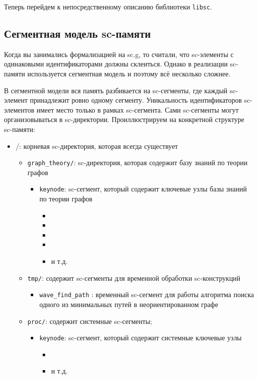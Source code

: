 Теперь перейдем к непосредственному описанию библиотеки
\texttt{libsc}.

\subsection{Сегментная модель sc-памяти}
\label{sec:libsc_segment_model}

Когда вы занимались формализацией на sc.g, то считали, что sc-элементы
с одинаковыми идентификаторами должны склеиться. Однако в реализации
sc-памяти используется сегментная модель и поэтому всё несколько
сложнее.

В сегментной модели вся память разбивается на sc-сегменты, где каждый
sc-элемент принадлежит ровно одному сегменту. Уникальность
идентификаторов sc-элементов имеет место только в рамках
sc-сегмента. Сами sc-сегменты могут организовываться в
sc-директории. Проиллюстрируем на конкретной структуре sc-памяти:

\begin{itemize}
\item /: корневая sc-директория, которая всегда существует

  \begin{itemize}
  \item \verb|graph_theory/|: sc-директория, которая содержит базу знаний по
    теории графов
    \begin{itemize}
    \item \verb|keynode|: sc-сегмент, который содержит ключевые
      узлы базы знаний по теории графов
      \begin{itemize}
      \item {}
      \item {}
      \item {}
      \item {}
      \item {} и т.д.
      \end{itemize}
    \end{itemize}

  \item \verb|tmp/|: содержит sc-сегменты для временной обработки
    sc-конструкций
    \begin{itemize}
    \item \verb|wave_find_path| : временный sc-сегмент для работы алгоритма
      поиска одного из минимальных путей в неориентированном графе
    \end{itemize}

  \item \verb|proc/|: содержит системные sc-сегменты;
    \begin{itemize}
    \item \verb|keynode|: sc-сегмент, который содержит системные ключевые
      узлы
      \begin{itemize}
      \item {}
      \item {} и т.д.
      \end{itemize}
    \end{itemize}
  \end{itemize}
\end{itemize}


